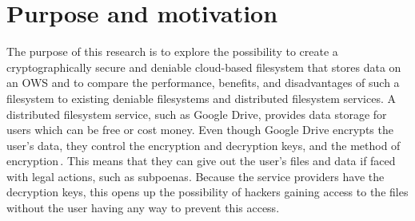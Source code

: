 
\section{Purpose and motivation}

The purpose of this research is to explore the possibility to create a cryptographically secure and deniable \mbox{cloud-based} filesystem that stores data on an \gls{OWS} and to compare the performance, benefits, and disadvantages of such a filesystem to existing deniable filesystems and distributed filesystem services. A distributed filesystem service, such as Google Drive, provides data storage for users which can be free or cost money. Even though Google Drive encrypts the user's data, they control the encryption and decryption keys, and the method of encryption\,\cite{johnsonGoogleDriveSecure2021}. This means that they can give out the user's files and data if faced with legal actions, such as subpoenas. Because the service providers have the decryption keys, this opens up the possibility of hackers gaining access to the files without the user having any way to prevent this access.


